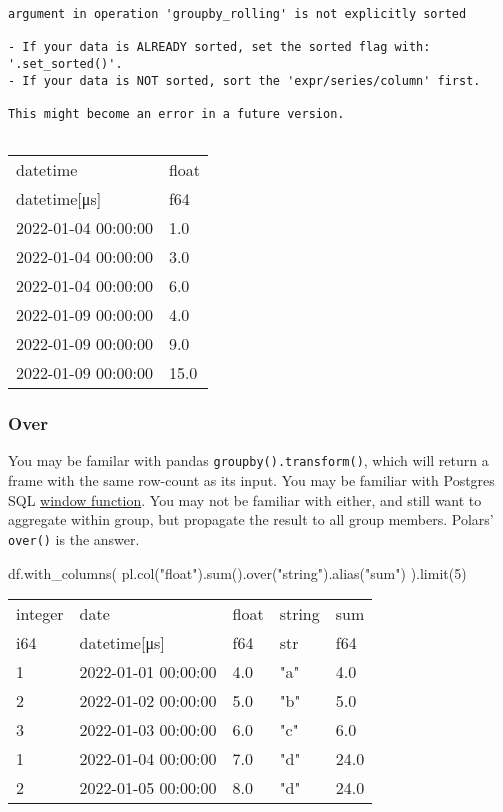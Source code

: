 \documentclass[
  letterpaper,
  DIV=11,
  numbers=noendperiod]{scrartcl}
\newenvironment{Shaded}{\begin{snugshade}}{\end{snugshade}}
\newcommand{\BuiltInTok}[1]{\textcolor[rgb]{0.00,0.23,0.31}{#1}}
\newcommand{\DecValTok}[1]{\textcolor[rgb]{0.68,0.00,0.00}{#1}}
\newcommand{\NormalTok}[1]{\textcolor[rgb]{0.00,0.23,0.31}{#1}}
\newcommand{\StringTok}[1]{\textcolor[rgb]{0.13,0.47,0.30}{#1}}
\begin{document}
\begin{verbatim}
argument in operation 'groupby_rolling' is not explicitly sorted

- If your data is ALREADY sorted, set the sorted flag with: '.set_sorted()'.
- If your data is NOT sorted, sort the 'expr/series/column' first.

This might become an error in a future version.
    
\end{verbatim}

\begin{longtable}[]{@{}ll@{}}
\toprule()
datetime & float \\
datetime{[}μs{]} & f64 \\
\midrule()
\endhead
2022-01-04 00:00:00 & 1.0 \\
2022-01-04 00:00:00 & 3.0 \\
2022-01-04 00:00:00 & 6.0 \\
2022-01-09 00:00:00 & 4.0 \\
2022-01-09 00:00:00 & 9.0 \\
2022-01-09 00:00:00 & 15.0 \\
\bottomrule()
\end{longtable}

\hypertarget{over}{%
\subsubsection{Over}\label{over}}

You may be familar with pandas \texttt{groupby().transform()}, which
will return a frame with the same row-count as its input. You may be
familiar with Postgres SQL
\href{https://www.postgresql.org/docs/current/tutorial-window.html}{window
function}. You may not be familiar with either, and still want to
aggregate within group, but propagate the result to all group members.
Polars' \texttt{over()} is the answer.

\begin{Shaded}
\begin{Highlighting}[]
\NormalTok{df.with\_columns(}
\NormalTok{  pl.col(}\StringTok{"float"}\NormalTok{).}\BuiltInTok{sum}\NormalTok{().over(}\StringTok{"string"}\NormalTok{).alias(}\StringTok{"sum"}\NormalTok{)}
\NormalTok{).limit(}\DecValTok{5}\NormalTok{)}
\end{Highlighting}
\end{Shaded}

\begin{longtable}[]{@{}lllll@{}}
\toprule()
integer & date & float & string & sum \\
i64 & datetime{[}μs{]} & f64 & str & f64 \\
\midrule()
\endhead
1 & 2022-01-01 00:00:00 & 4.0 & "a" & 4.0 \\
2 & 2022-01-02 00:00:00 & 5.0 & "b" & 5.0 \\
3 & 2022-01-03 00:00:00 & 6.0 & "c" & 6.0 \\
1 & 2022-01-04 00:00:00 & 7.0 & "d" & 24.0 \\
2 & 2022-01-05 00:00:00 & 8.0 & "d" & 24.0 \\
\bottomrule()
\end{longtable}
\end{document}
